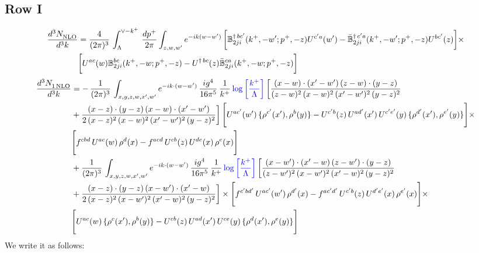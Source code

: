\documentclass[9pt]{article}
\def\mf#1{\mathbb{#1}}
\numberwithin{equation}{section}
\begin{document}
\subsection{Row I}
\begin{align}
    \frac{d^{3}N_{\rm NLO}^{\rm}}{d^{3}k}  & = \frac{4}{(2\pi)^{3}}\,\int_{\Lambda}^{\vee-k^{+}}\, \frac{dp^{+}}{2\pi}\int_{z,w,w^{\prime}} e^{-ik(w-w^{\prime})}\, \bigg[\mf{B}^{\dagger\, bc^{\prime}}_{2ji}(k^{+},-w^{\prime};p^{+},-z)U^{ c^{\prime}a}(w^{\prime}) -\Bar{\mf{B}}^{\dagger\, c^{\prime}a}_{2ji}(k^{+},-w^{\prime}; p^{+},-z)U^{bc^{\prime}}(z)\bigg]\times\notag \\ & \bigg[U^{ac}(w) \mf{B}^{bc}_{2ji}(k^{+},-w;p^{+},-z) -U^{\dagger\, bc}(z)\Bar{\mf{B}}^{ca}_{2ji}(k^{+},-w; p^{+},-z)\bigg]\nonumber
\end{align}
\begin{align}
 \frac{d^{3}N_{1\,\rm NLO}^{\rm}}{d^{3}k}  & =   -\, \frac{1}{(2\pi)^{3}}\,\int_{x,y,z,w,x',w^{\prime}} e^{-ik\cdot (w-w')}\,\frac{ig^{4}}{16\pi^{5}}\,\frac{1}{k^{+}}\,{\color{blue}\log{\left[\frac{k^{+}}{\Lambda}\right]}}\,\bigg[\frac{(x-w)\cdot (x'-w')\,(z-w)\cdot (y-z)}{(z-w)^{2}\,(x-w)^{2}\,(x'-w')^{2}\,(y-z)^{2}}\notag \\ & +\frac{(x-z)\cdot (y-z)\,(x-w)\cdot (x'-w')}{2\,(x-z)^{2}\, (x-w)^{2}\,(x'-w')^{2}\,(y-z)^{2}}\bigg]\, \Bigg[U^{ac'}(w')\,\{\rho^{c'}(x'),\rho^{b}(y)\}-U^{c'b}(z)\,U^{ad'}(x')\,U^{c'e'}(y)\, \{\rho^{d'}(x'),\rho^{e'}(y)\}\Bigg]\times \notag \\ & \Bigg[f^{cbd}\,U^{ac}(w)\,\rho^{d}(x)-f^{acd}\, U^{cb}(z)\,U^{de}(x)\,\rho^{e}(x)\Bigg]\notag \\ & + \frac{1}{(2\pi)^{3}}\,\int_{x,y,z,w,x',w^{\prime}} e^{-ik\cdot (w-w')}\,\frac{ig^{4}}{16\pi^{5}}\,\frac{1}{k^{+}}\,{\color{blue}\log{\left[\frac{k^{+}}{\Lambda}\right]}}\,\bigg[\frac{(x-w')\cdot (x'-w)\,(z-w')\cdot (y-z)}{(z-w')^{2}\,(x-w')^{2}\,(x'-w)^{2}\,(y-z)^{2}}\notag \\ & +\frac{(x-z)\cdot (y-z)\,(x-w')\cdot (x'-w)}{2\,(x-z)^{2}\, (x-w')^{2}\,(x'-w)^{2}\,(y-z)^{2}}\bigg] \times\Bigg[f^{c'bd'}\,U^{ac'}(w')\,\rho^{d'}(x)-f^{ac'd'}\, U^{c'b}(z)\,U^{d'e'}(x)\,\rho^{e'}(x)\Bigg] \times \notag \\ & \Bigg[U^{ac}(w)\,\{\rho^{c}(x'),\rho^{b}(y)\}-U^{cb}(z)\,U^{ad}(x')\,U^{ce}(y)\, \{\rho^{d}(x'),\rho^{e}(y)\}\Bigg]
\end{align}
We write it as follows: 
\end{document}
